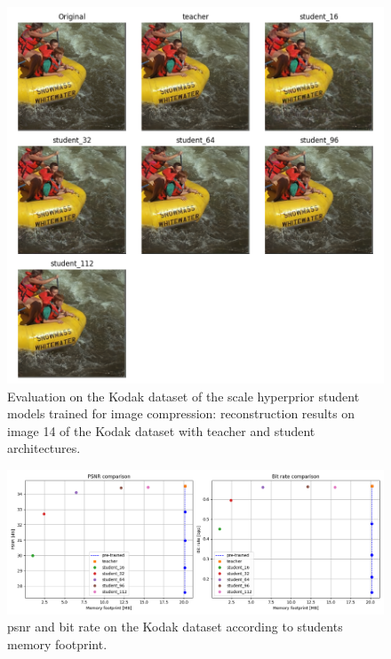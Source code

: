 \begin{figure}
    \centering
    \includegraphics[width=15cm]{img/kd_lic_kodak_14.png}
    \caption[Evaluation on the Kodak dataset of the scale hyperprior student models trained for image compression: reconstruction results on image 14 of the Kodak dataset with teacher and student architectures.]{Evaluation on the Kodak dataset of the scale hyperprior student models trained for image compression: reconstruction results on image 14 of the Kodak dataset with teacher and student architectures.}
    \label{appendix:kd_lic_2:a}
\end{figure}

\begin{figure}
    \centering
    \includegraphics[width=15cm]{img/kd_lic_memory.png}
    \caption[\acrshort{psnr} and bit rate on the Kodak dataset according to students memory footprint.]{\acrshort{psnr} and bit rate on the Kodak dataset according to students memory footprint.}
    \label{appendix:kd_lic_memory}
\end{figure}

